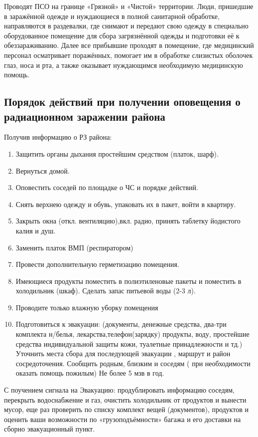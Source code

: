 \documentclass[a4paper, 12pt]{article}
\theoremstyle{definition}
\begin{document}
        Проводят ПСО на границе «Грязной» и «Чистой» территории.
        Люди, пришедшие в заражённой одежде и нуждающиеся в полной санитарной обработке, направляются в раздевалки, где снимают и передают свою одежду в специально оборудованное помещение для сбора загрязнённой одежды и подготовки её к обеззараживанию. Далее все прибывшие проходят в помещение, где медицинский персонал осматривает поражённых, помогает им в обработке слизистых оболочек глаз, носа и рта, а также оказывает нуждающимся необходимую медицинскую помощь.

        \subsection{Порядок действий при получении оповещения о радиационном заражении района}
        Получив информацию о РЗ района: 
        \begin{enumerate}
            \item Защитить органы дыхания простейшим средством (платок, шарф).
            \item Вернуться домой.
            \item Оповестить соседей по площадке о ЧС и порядке действий.
            \item Снять верхнею одежду и обувь, упаковать их в пакет, войти в квартиру.
            \item Закрыть  окна (откл. вентиляцию),вкл. радио, принять таблетку йодистого калия   и  душ.
            \item Заменить платок ВМП  (респиратором)
            \item Провести дополнительную герметизацию помещения.
            \item Имеющиеся продукты поместить в полиэтиленовые пакеты и поместить в холодильник (шкаф). Сделать запас питьевой воды (2-3 л).
            \item Проводите только влажную уборку помещения
            \item Подготовиться к эвакуации: (документы, денежные средства, два-три комплекта н/белья, лекарства,телефон(зарядку) продукты, воду, простейшие средства индивидуальной  защиты кожи, туалетные принадлежности  и тд.) Уточнить места сбора для последующей эвакуации , маршрут и район сосредоточения. Сообщить родным, близким и соседям ( при необходимости оказать помощь пожилым)
            Не более 5 мзв в год.
        \end{enumerate}

        С поучением сигнала на Эвакуацию: продублировать информацию соседям, перекрыть водоснабжение и газ,  очистить холодильник от продуктов и вынести мусор, еще раз проверить по списку комплект вещей (документов), продуктов и оценить ваши возможности по «грузоподъёмности» багажа и его доставки на сборно эвакуационный пункт. 
\end{document}
